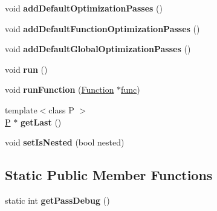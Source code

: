 \begin{DoxyCompactItemize}
\item 
\mbox{\label{structwasm_1_1_pass_runner_acc073de7b7d871e645bda287ab758d29}} 
void {\bfseries add\+Default\+Optimization\+Passes} ()
\item 
\mbox{\label{structwasm_1_1_pass_runner_a7c6de256acc68a4dc85c4a4c3cddd837}} 
void {\bfseries add\+Default\+Function\+Optimization\+Passes} ()
\item 
\mbox{\label{structwasm_1_1_pass_runner_aa15c5f63b01c55e0200673f577a2fe91}} 
void {\bfseries add\+Default\+Global\+Optimization\+Passes} ()
\item 
\mbox{\label{structwasm_1_1_pass_runner_a3565a413890986ed868c6ba3c0d804ce}} 
void {\bfseries run} ()
\item 
\mbox{\label{structwasm_1_1_pass_runner_abf961c60ff34486fa472a9b2357a4f32}} 
void {\bfseries run\+Function} (\mbox{\hyperlink{classwasm_1_1_function}{Function}} $\ast$\mbox{\hyperlink{structfunc}{func}})
\item 
\mbox{\label{structwasm_1_1_pass_runner_abd28f2f095a4d2dc455aa10ff5ca0d2e}} 
{\footnotesize template$<$class P $>$ }\\\mbox{\hyperlink{struct_p}{P}} $\ast$ {\bfseries get\+Last} ()
\item 
\mbox{\label{structwasm_1_1_pass_runner_aa2bb917796d8b5322746a488b12cf9c2}} 
void {\bfseries set\+Is\+Nested} (bool nested)
\end{DoxyCompactItemize}
\subsection*{Static Public Member Functions}
\begin{DoxyCompactItemize}
\item 
\mbox{\label{structwasm_1_1_pass_runner_a842061dfcc62f25574c778d71f78a8fc}} 
static int {\bfseries get\+Pass\+Debug} ()
\end{DoxyCompactItemize}
